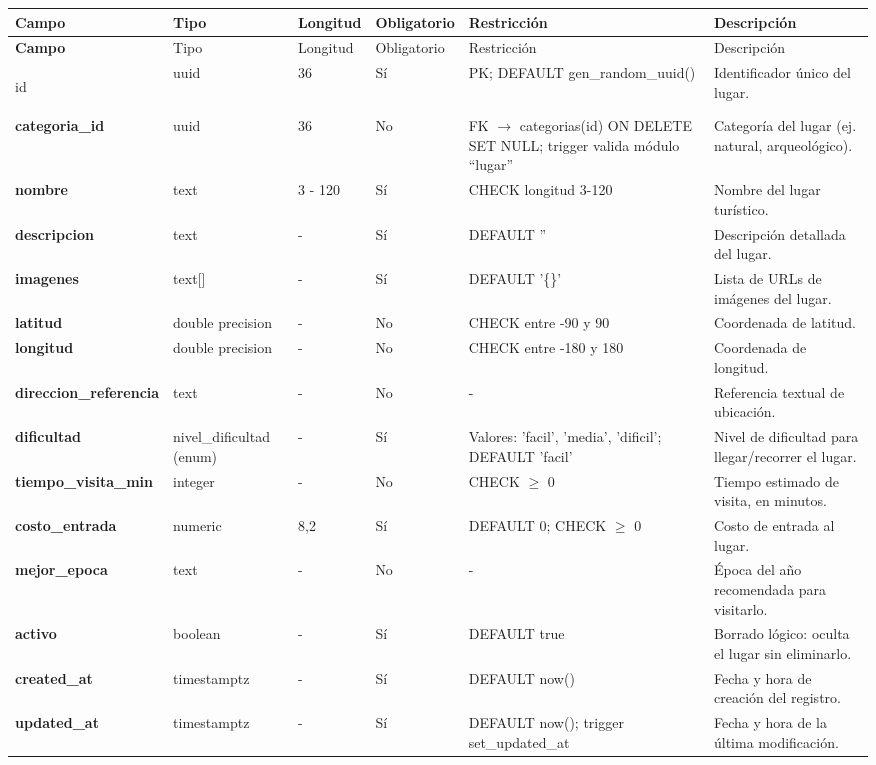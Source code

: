 {\footnotesize
\begin{longtable}{|>{\bfseries}p{3.3cm}|p{2.6cm}|p{1.2cm}|p{1.6cm}|p{2.8cm}|p{4.0cm}|}
\hline
Campo & Tipo & Longitud & Obligatorio & Restricción & Descripción \\ \hline
\endfirsthead
\hline
Campo & Tipo & Longitud & Obligatorio & Restricción & Descripción \\ \hline
\endhead
\hline
\endfoot
\hline
\endlastfoot

id & uuid & 36 & Sí & PK; DEFAULT gen\_random\_uuid() & Identificador único del lugar. \\ \hline
categoria\_id & uuid & 36 & No & FK $\rightarrow$ categorias(id) ON DELETE SET NULL; trigger valida módulo ``lugar'' & Categoría del lugar (ej. natural, arqueológico). \\ \hline
nombre & text & 3 - 120 & Sí & CHECK longitud 3-120 & Nombre del lugar turístico. \\ \hline
descripcion & text & - & Sí & DEFAULT '' & Descripción detallada del lugar. \\ \hline
imagenes & text[] & - & Sí & DEFAULT '\{\}' & Lista de URLs de imágenes del lugar. \\ \hline
latitud & double precision & - & No & CHECK entre -90 y 90 & Coordenada de latitud. \\ \hline
longitud & double precision & - & No & CHECK entre -180 y 180 & Coordenada de longitud. \\ \hline
direccion\_referencia & text & - & No & - & Referencia textual de ubicación. \\ \hline
dificultad & nivel\_dificultad (enum) & - & Sí & Valores: 'facil', 'media', 'dificil'; DEFAULT 'facil' & Nivel de dificultad para llegar/recorrer el lugar. \\ \hline
tiempo\_visita\_min & integer & - & No & CHECK $\geq$ 0 & Tiempo estimado de visita, en minutos. \\ \hline
costo\_entrada & numeric & 8,2 & Sí & DEFAULT 0; CHECK $\geq$ 0 & Costo de entrada al lugar. \\ \hline
mejor\_epoca & text & - & No & - & Época del año recomendada para visitarlo. \\ \hline
activo & boolean & - & Sí & DEFAULT true & Borrado lógico: oculta el lugar sin eliminarlo. \\ \hline
created\_at & timestamptz & - & Sí & DEFAULT now() & Fecha y hora de creación del registro. \\ \hline
updated\_at & timestamptz & - & Sí & DEFAULT now(); trigger set\_updated\_at & Fecha y hora de la última modificación. \\ \hline
\end{longtable}
}

